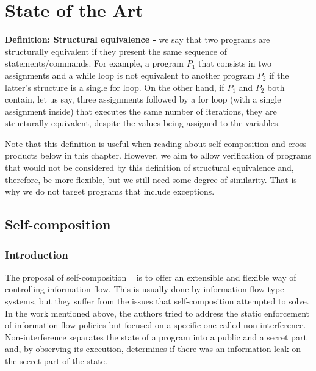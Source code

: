 
%

\makeatletter
\newcommand{\ntifpkgloaded}{%
  \@ifpackageloaded%
}
\makeatother


\chapter{State of the Art}
\label{cha:state_of_the_art}

\textbf{Definition: Structural equivalence -} we say that two programs are structurally equivalent if they present the same sequence of statements/commands.
For example, a program \emph{$P_1$} that consists in two assignments and a while loop is not equivalent to another program \emph{$P_2$} if the latter's structure is a single for loop.
On the other hand, if \emph{$P_1$} and \emph{$P_2$} both contain, let us say, three assignments followed by a for loop (with a single assignment inside) that executes the same number of iterations, they are structurally equivalent, despite the values being assigned to the variables.

Note that this definition is useful when reading about self-composition and cross-products below in this chapter.
However, we aim to allow verification of programs that would not be considered by this definition of structural equivalence and, therefore, be more flexible, but we still need some degree of similarity.
That is why we do not target programs that include exceptions.


\section{Self-composition} 
\label{sec:self_composition}

\subsection{Introduction}
\label{subsec:self_composition_intro}

The proposal of self-composition ~\cite{DBLP:conf/csfw/BartheDR04} is to offer an extensible and flexible way of controlling information flow.
This is usually done by information flow type systems, but they suffer from the issues that self-composition attempted to solve.
In the work mentioned above, the authors tried to address the static enforcement of information flow policies but focused on a specific one called non-interference.
Non-interference separates the state of a program into a public and a secret part and, by observing its execution, determines if there was an information leak on the secret part of the state.

